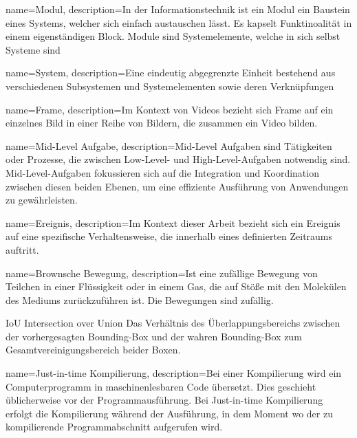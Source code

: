 
{
        name=Modul,
        description={In der Informationstechnik ist ein Modul ein Baustein eines Systems, welcher sich einfach austauschen lässt. Es kapselt Funktinoalität in einem eigenständigen Block. Module sind Systemelemente, welche in sich selbst Systeme sind}
}

{
        name=System,
        description={Eine eindeutig abgegrenzte Einheit bestehend aus verschiedenen Subsystemen und Systemelementen sowie deren Verknüpfungen}
}

{
        name=Frame,
        description={Im Kontext von Videos bezieht sich Frame auf ein einzelnes Bild in einer Reihe von Bildern, die zusammen ein Video bilden.}
}

{
        name=Mid-Level Aufgabe,
        description={Mid-Level Aufgaben sind Tätigkeiten oder Prozesse, die zwischen Low-Level- und High-Level-Aufgaben notwendig sind. Mid-Level-Aufgaben fokussieren sich auf die Integration und Koordination zwischen diesen beiden Ebenen, um eine effiziente Ausführung von Anwendungen zu gewährleisten.}
}

{
        name=Ereignis,
        description={Im Kontext dieser Arbeit bezieht sich ein Ereignis auf eine spezifische Verhaltensweise, die innerhalb eines definierten Zeitraums auftritt.}
}

{
        name=Brownsche Bewegung,
        description={Ist eine zufällige Bewegung von Teilchen in einer Flüssigkeit oder in einem Gas, die auf Stöße mit den Molekülen des Mediums zurückzuführen ist. Die Bewegungen sind zufällig.}
}

\newglossaryentrywithacronym
{IoU}
{Intersection over Union}
{Das Verhältnis des Überlappungsbereichs zwischen der vorhergesagten Bounding-Box und der wahren Bounding-Box zum Gesamtvereinigungsbereich beider Boxen.}

{
        name=Just-in-time Kompilierung,
        description={Bei einer Kompilierung wird ein Computerprogramm in maschinenlesbaren Code übersetzt. Dies geschieht üblicherweise vor der Programmausführung. Bei Just-in-time Kompilierung erfolgt die Kompilierung während der Ausführung, in dem Moment wo der zu kompilierende Programmabschnitt aufgerufen wird.}
}

